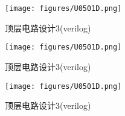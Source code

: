 \documentclass[12pt,hyperref,a4paper,UTF8]{ctexart}
\begin{document}
\begin{figure}[H]
    \centering
    \begin{minipage}{1\textwidth}
        \centering
        \texttt{[image: figures/U0501D.png]}
        \caption{顶层电路设计3(verilog)}
        \label{fig:system_block_diagram}
    \end{minipage}
\end{figure}

\begin{figure}[H]
    \centering
    \begin{minipage}{1\textwidth}
        \centering
        \texttt{[image: figures/U0501D.png]}
        \caption{顶层电路设计3(verilog)}
        \label{fig:system_block_diagram}
    \end{minipage}
\end{figure}

\begin{figure}[H]
    \centering
    \begin{minipage}{1\textwidth}
        \centering
        \texttt{[image: figures/U0501D.png]}
        \caption{顶层电路设计3(verilog)}
        \label{fig:system_block_diagram}
    \end{minipage}
\end{figure}
\end{document}
